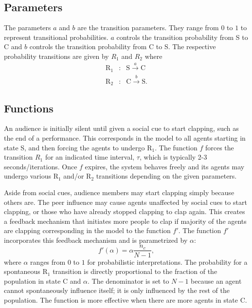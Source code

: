 \subsection{Parameters}
The parameters $a$ and $b$ are the transition parameters.
They range from $0$ to $1$ to represent transitional probabilities.
$a$ controls the transition probability from S to C and $b$ controls the transition probability from C to S.
The respective probability transitions are given by ${R}_{1}$ and ${R}_{2}$ where
\begin{eqnarray}
\mathrm{R}_{1} &:& \mathrm{S} \overset{a}{\longrightarrow} \mathrm{C} \label{eq:r1} \\
\mathrm{R}_{2} &:& \mathrm{C} \overset{b}{\longrightarrow} \mathrm{S}.\label{eq:r2}
\end{eqnarray}


\subsection{Functions}
An audience is initially silent until given a social cue to start clapping, such as the end of a performance. 
This corresponds in the model to all agents starting in state S, and then forcing the agents to undergo $\mathrm{R}_{1}$.
The function $f$ forces the transition ${R}_{1}$ for an indicated time interval, $\tau$, which is typically 2-3 seconds/iterations.
Once $f$ expires, the system behaves freely and its agents may undergo various $\mathrm{R}_{1}$ and/or $\mathrm{R}_{2}$ transitions depending on the given parameters.


Aside from social cues, audience members may start clapping simply because others are.
The peer influence may cause agents unaffected by social cues to start clapping, or those who have already stopped clapping to clap again.
This creates a feedback mechanism that initiates more people to clap if majority of the agents are clapping corresponding in the model to the function $f'$.
The function $f'$ incorporates this feedback mechanism and is parametrized by $\alpha$:
\begin{equation}\label{eq:f'}
  f'(\alpha) = \alpha \frac{n_c}{N-1},
\end{equation}
where $\alpha$ ranges from $0$ to $1$ for probabilistic interpretations.
The probability for a spontaneous $\mathrm{R}_{1}$ transition is directly proportional to the fraction of the population in state C and $\alpha$. The denominator is set to $N-1$ because an agent cannot spontaneously influence itself; it is only influenced by the rest of the population.
The function is more effective when there are more agents in state C.

